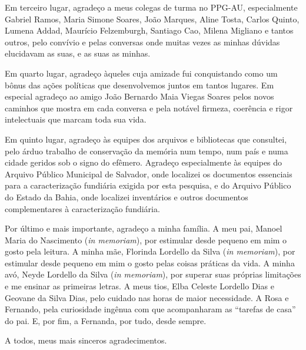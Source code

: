 \begin{agradecimentos}
Em terceiro lugar, agradeço a meus colegas de turma no PPG-AU, especialmente Gabriel Ramos, Maria Simone Soares, João Marques, Aline Tosta, Carlos Quinto, Lumena Addad, Maurício Felzemburgh, Santiago Cao, Milena Migliano e tantos outros, pelo convívio e pelas conversas onde muitas vezes as minhas dúvidas elucidavam as suas, e as suas as minhas.

Em quarto lugar, agradeço àqueles cuja amizade fui conquistando como um bônus das ações políticas que desenvolvemos juntos em tantos lugares. Em especial agradeço ao amigo João Bernardo Maia Viegas Soares pelos novos caminhos que mostra em cada conversa e pela notável firmeza, coerência e rigor intelectuais que marcam toda sua vida.

Em quinto lugar, agradeço às equipes dos arquivos e bibliotecas que consultei, pelo árduo trabalho de conservação da memória num tempo, num país e numa cidade geridos sob o signo do efêmero. Agradeço especialmente às equipes do Arquivo Público Municipal de Salvador, onde localizei os documentos essenciais para a caracterização fundiária exigida por esta pesquisa, e do Arquivo Público do Estado da Bahia, onde localizei inventários e outros documentos complementares à caracterização fundiária.

Por último e mais importante, agradeço a minha família. A meu pai, Manoel Maria do Nascimento (\textit{in memoriam}), por estimular desde pequeno em mim o gosto pela leitura. A minha mãe, Florinda Lordello da Silva (\textit{in memoriam}), por estimular desde pequeno em mim o gosto pelas coisas práticas da vida. A minha avó, Neyde Lordello da Silva (\textit{in memoriam}), por superar suas próprias limitações e me ensinar as primeiras letras. A meus tios, Elba Celeste Lordello Dias e Geovane da Silva Dias, pelo cuidado nas horas de maior necessidade. A Rosa e Fernando, pela curiosidade ingênua com que acompanharam as ``tarefas de casa'' do pai. E, por fim, a Fernanda, por tudo, desde sempre.

A todos, meus mais sinceros agradecimentos.

\end{agradecimentos}
